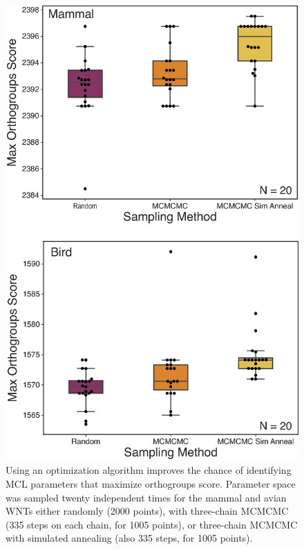 \documentclass[twocolumn]{bmcart}  %
\begin{document}
\begin{figure}[t]
  \begin{center}
  \includegraphics[height=0.5\textheight]{../figures/random_vs_mcmcmc.eps}
\end{center}
\caption{Using an optimization algorithm improves the chance of identifying MCL parameters that maximize orthogroups score. Parameter space was sampled twenty independent times for the mammal and avian WNTs either randomly (2000 points), with three-chain MCMCMC (335 steps on each chain, for 1005 points), or three-chain MCMCMC with simulated annealing (also 335 steps, for 1005 points).}
\label{fig:random_vs_mcmcmc}
\end{figure}
\end{document}
